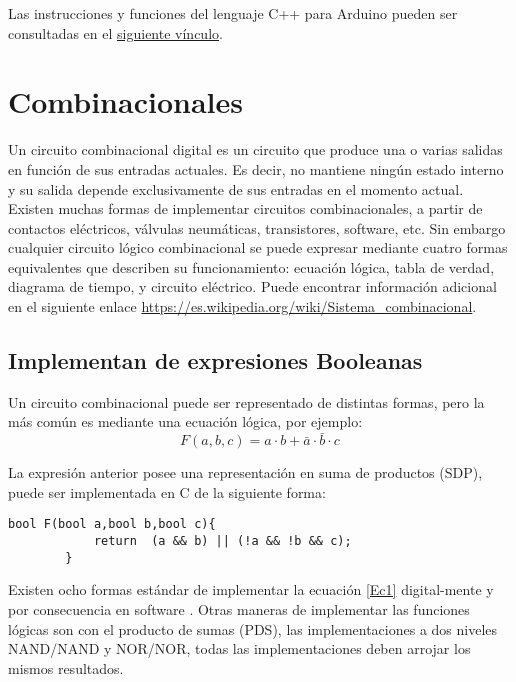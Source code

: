 Las instrucciones y funciones del lenguaje C++ para Arduino pueden ser consultadas en el \href{https://www.arduino.cc/reference/en/}{siguiente vínculo}.


\section{Combinacionales}

Un circuito combinacional digital es un circuito que produce una o varias salidas en función de sus entradas actuales. Es decir, no mantiene ningún estado interno y su salida depende exclusivamente de sus entradas en el momento actual.
Existen muchas formas de implementar circuitos combinacionales, a partir de contactos eléctricos, válvulas neumáticas, transistores, software, etc. Sin embargo cualquier circuito lógico combinacional se puede expresar mediante cuatro formas equivalentes que describen su funcionamiento: ecuación lógica, tabla de verdad, diagrama de tiempo, y circuito eléctrico. 
Puede encontrar información adicional en el siguiente enlace \href{https://es.wikipedia.org/wiki/Sistema_combinacional}{https://es.wikipedia.org/wiki/Sistema\_combinacional}.   

\subsection{Implementan de expresiones Booleanas }

Un circuito combinacional  puede ser representado de distintas formas, pero la más común es mediante una ecuación lógica, por ejemplo: 
\begin{equation}
\label{Ec1}
F(a,b,c)=a\cdot b+\bar{a}\cdot \bar{b}\cdot c
\end{equation}

La expresión anterior posee una representación en suma de productos (SDP), puede ser implementada en C de la siguiente forma:

		 \begin{lstlisting}[language=Arduino,numbers=none, showstringspaces=false]
		bool F(bool a,bool b,bool c){
			return  (a && b) || (!a && !b && c);
		}
		\end{lstlisting} 

Existen ocho formas estándar de implementar la ecuación \eqref{Ec1} digital-mente y por consecuencia en software . Otras maneras de implementar las funciones lógicas  son con el producto de sumas (PDS), las implementaciones a dos niveles  NAND/NAND y NOR/NOR, todas las implementaciones deben arrojar los mismos resultados.


